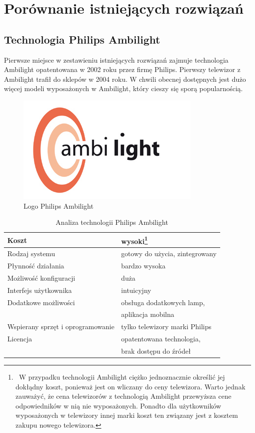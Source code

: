 \documentclass[12pt]{report}
\begin{document}
\section{Porównanie istniejących rozwiązań} \label{por}

\subsection{Technologia Philips Ambilight}

Pierwsze miejsce w zestawieniu istniejących rozwiązań zajmuje technologia Ambilight opatentowana w 2002 roku przez firmę Philips. Pierwszy telewizor z Ambilight trafił do sklepów w 2004 roku. W chwili obecnej dostępnych jest dużo więcej modeli wyposażonych w Ambilight, który cieszy się sporą popularnością.

\begin{figure}[h]
\centering
\includegraphics[width=.7\textwidth]{../resources/ambilight.jpg}
\caption[Logo Philips Ambilight]{Logo Philips Ambilight \cite{ambilight}}
\end{figure}

\newpage

\begin{table}[h]
\centering
\begin{tabular}{| l | l |} 
\hline 
Koszt & wysoki\footnote{~W przypadku technologii Ambilight ciężko jednoznacznie określić jej dokłądny koszt, ponieważ jest on wliczany do ceny telewizora. Warto jednak zauważyć, że cena telewizorów z technologią Ambilight przewyższa cene odpowiedników w nią nie wyposażonych. Ponadto dla użytkowników wyposażonych w telewizory innej marki koszt ten związany jest z kosztem zakupu nowego telewizora.} \\ \hline
Rodzaj systemu & gotowy do użycia, zintegrowany \\ \hline
Płynność działania & bardzo wysoka \\ \hline
Możliwość konfiguracji & duża  \\ \hline
Interfejs użytkownika & intuicyjny  \\ \hline
Dodatkowe możliwości &  obsługa dodatkowych lamp, \\ \hline
&  aplikacja mobilna \\ \hline
Wspierany sprzęt i oprogramowanie &  tylko telewizory marki Philips   \\ \hline
Licencja & opatentowana technologia,  \\ \hline
& brak dostępu do źródeł  \\ \hline
\end{tabular} 
\caption{Analiza technologii Philips Ambilight}
\end{table}
\end{document}
